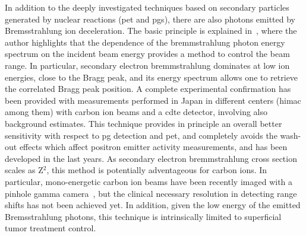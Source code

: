 In addition to the deeply investigated techniques based  on secondary particles generated by nuclear reactions (\gls{pet} and \glspl{pg}), there are also photons emitted by Bremsstrahlung ion deceleration. The basic principle is explained in~\cite{Yamaguchi2012}, where the author highlights that the dependence of the bremmstrahlung photon energy spectrum on the incident beam energy provides a method to control the beam range. In particular, secondary electron bremmstrahlung dominates at low ion energies, close to the Bragg peak, and its energy spectrum allows one to retrieve the correlated Bragg peak position. A complete experimental confirmation has been provided with measurements performed in Japan in different centers (\gls{himac} among them) with carbon ion beams and a \gls{cdte} detector, involving also background estimates. This technique provides in principle an overall better sensitivity with respect to \gls{pg} detection and \gls{pet}, and completely avoids the wash-out effects which affect positron emitter activity measurements, and has been developed in the last years. As secondary electron bremmstrahlung cross section scales as Z$^2$, this method is potentially adventageous for carbon ions. In particular, mono-energetic carbon ion beams have been recently imaged with a pinhole gamma camera~\parencite{Yamaguchi2018}, but the clinical necessary resolution in detecting range shifts has not been achieved yet. In addition, given the low energy of the emitted Bremsstrahlung photons, this technique is intrinsically limited to superficial tumor treatment control.

